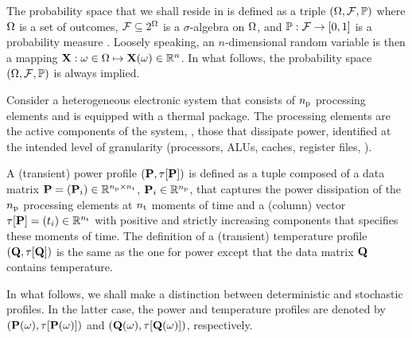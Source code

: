 
The probability space that we shall reside in is defined as a triple $(\Omega, \mathcal{F}, \mathbb{P})$ where $\Omega$ is a set of outcomes, $\mathcal{F} \subseteq 2^\Omega$ is a $\sigma$-algebra on $\Omega$, and $\mathbb{P}: \mathcal{F} \to [0, 1]$ is a probability measure \cite{maitre2010}.
Loosely speaking, an $n$-dimensional random variable is then a mapping $\mathbf{X}: \omega \in \Omega \mapsto \mathbf{X}(\omega) \in \mathbb{R}^n$.
In what follows, the probability space $(\Omega, \mathcal{F}, \mathbb{P})$ is always implied.

Consider a heterogeneous electronic system that consists of ${n_\text{p}}$ processing elements and is equipped with a thermal package.
The processing elements are the active components of the system, \ie, those that dissipate power, identified at the intended level of granularity (processors, ALUs, caches, register files, \etc).

A (transient) power profile $\profileP$ is defined as a tuple composed of a data matrix $\mP = (\vP_i) \in \real^{\nprocs \times \nsteps}$, $\mathbf{P}_i \in \mathbb{R}^{n_\text{p}}$, that captures the power dissipation of the ${n_\text{p}}$ processing elements at ${n_\text{t}}$ moments of time and a (column) vector $\partition{\mP} = (\t_i) \in \real^{\nsteps}$ with positive and strictly increasing components that specifies these moments of time.
The definition of a (transient) temperature profile $\profileT$ is the same as the one for power except that the data matrix $\mTO$ contains temperature.

In what follows, we shall make a distinction between deterministic and stochastic profiles.
In the latter case, the power and temperature profiles are denoted by $\profileP{\o}$ and $\profileT{\o}$, respectively.

